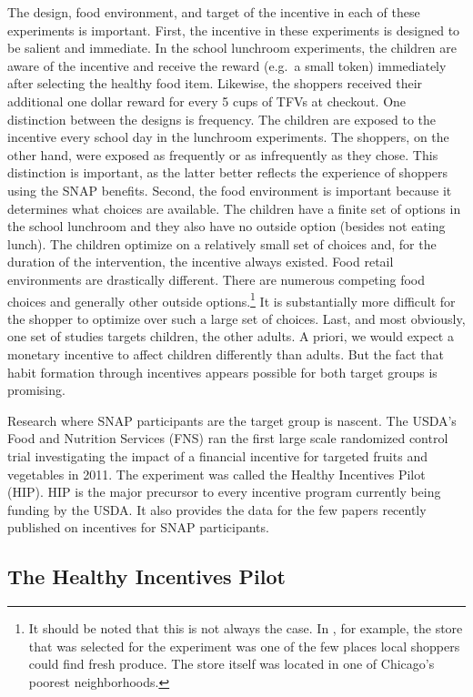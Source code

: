 \documentclass[12pt,letterpaperpaper,]{book}
\begin{document}
The design, food environment, and target of the incentive in each of
these experiments is important. First, the incentive in these
experiments is designed to be salient and immediate. In the school
lunchroom experiments, the children are aware of the incentive and
receive the reward (e.g.~a small token) immediately after selecting the
healthy food item. Likewise, the shoppers received their additional one
dollar reward for every 5 cups of TFVs at checkout. One distinction
between the designs is frequency. The children are exposed to the
incentive every school day in the lunchroom experiments. The shoppers,
on the other hand, were exposed as frequently or as infrequently as they
chose. This distinction is important, as the latter better reflects the
experience of shoppers using the SNAP benefits. Second, the food
environment is important because it determines what choices are
available. The children have a finite set of options in the school
lunchroom and they also have no outside option (besides not eating
lunch). The children optimize on a relatively small set of choices and,
for the duration of the intervention, the incentive always existed. Food
retail environments are drastically different. There are numerous
competing food choices and generally other outside options.\footnote{It
  should be noted that this is not always the case. In
  \citet{list_incentives_2015}, for example, the store that was selected
  for the experiment was one of the few places local shoppers could find
  fresh produce. The store itself was located in one of Chicago's
  poorest neighborhoods.} It is substantially more difficult for the
shopper to optimize over such a large set of choices. Last, and most
obviously, one set of studies targets children, the other adults. A
priori, we would expect a monetary incentive to affect children
differently than adults. But the fact that habit formation through
incentives appears possible for both target groups is promising.

Research where SNAP participants are the target group is nascent. The
USDA's Food and Nutrition Services (FNS) ran the first large scale
randomized control trial investigating the impact of a financial
incentive for targeted fruits and vegetables in 2011. The experiment was
called the Healthy Incentives Pilot (HIP). HIP is the major precursor to
every incentive program currently being funding by the USDA. It also
provides the data for the few papers recently published on incentives
for SNAP participants.

\subsection*{The Healthy Incentives
Pilot}\label{the-healthy-incentives-pilot}
\end{document}
